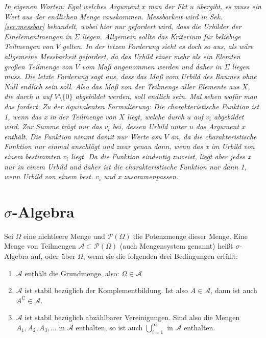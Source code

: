 \documentclass[paper=a4,10pt]{scrartcl}
\begin{document}
\noindent
\textit{In eigenen Worten: Egal welches Argument $x$ man der Fkt $u$ übergibt, es muss ein Wert aus der endlichen Menge rauskommen. Messbarkeit wird in Sek. \ref{sec:messbar} behandelt, wobei hier nur gefordert wird, dass die Urbilder der Einelementmengen in $\Sigma$ liegen. Allgemein sollte das Kriterium für beliebige Teilmengen von $V$ gelten. In der letzen Forderung sieht es doch so aus, als wäre allgemeine Messbarkeit gefordert, da das Urbild einer mehr als ein Elemten großen Teilmenge von $V$ vom Maß angenommen werden und daher in $\Sigma$ liegen muss. Die letzte Forderung sagt aus, dass das Maß vom Urbild des Raumes ohne Null endlich sein soll. Also das Maß von der Teilmenge aller Elemente aus $X$, die durch $u$ auf $V \setminus \{ 0\}$ abgebildet werden, soll endlich sein. Mal sehen wofür man das fordert. Zu der äquivalenten Formulierung: Die charakteristische Funktion ist 1, wenn das x in der Teilmenge von $X$ liegt, welche durch $u$ auf $v_i$ abgebildet wird. Zur Summe trägt nur das $v_i$ bei, dessen Urbild unter $u$ das Argument $x$ enthält. Die Funktion nimmt damit nur Werte asu $V$ an, da die charakteristische Funktion nur einmal anschlägt und zwar genau dann, wenn das x im Urbild von einem bestimmten $v_i$ liegt. Da die Funktion eindeutig zuweist, liegt aber jedes x nur in einem Urbild und daher ist die charakteristische Funktion nur dann 1, wenn Urbild von einem best. $v_i$ und x zusammenpassen.}



\section{$\sigma$-Algebra}
Sei $\Omega$ eine nichtleere Menge und $\mathcal{P}(\Omega)$ die Potenzmenge dieser Menge. Eine Menge von Teilmengen $\mathcal{A} \subset \mathcal{P}(\Omega)$ (auch Mengensystem genannt) heißt $\sigma$-Algebra auf, oder über $\Omega$, wenn sie die folgenden drei Bedingungen erfüllt:

\begin{enumerate}
	\item $\mathcal{A}$ enthält die Grundmenge, also: $\Omega \in \mathcal{A}$
	\item $\mathcal{A}$ ist stabil bezüglich der Komplementbildung. Ist also $A \in \mathcal{A}$, dann ist auch $A^{\mathrm{C}} \in \mathcal{A}$.
	\item $\mathcal{A}$ ist stabil bezüglich abzählbarer Vereinigungen. Sind also die Mengen $A_1, A_2, A_3, \dots$ in $\mathcal{A}$ enthalten, so ist auch $\bigcup^\infty_{i=1}$ in $\mathcal{A}$ enthalten.
\end{enumerate}
\end{document}
